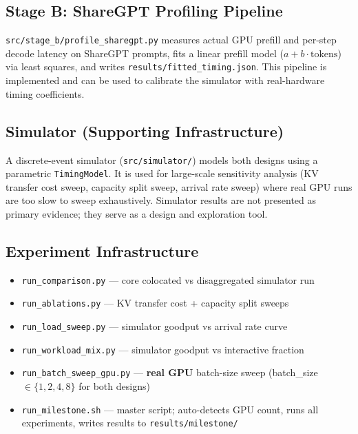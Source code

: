 \documentclass[11pt,letterpaper]{article}
\begin{document}
\subsection{Stage B: ShareGPT Profiling Pipeline}

\texttt{src/stage\_b/profile\_sharegpt.py} measures actual GPU prefill and per-step
decode latency on ShareGPT prompts, fits a linear prefill model
($a + b \cdot \text{tokens}$) via least squares, and writes
\texttt{results/fitted\_timing.json}. This pipeline is implemented and can be used
to calibrate the simulator with real-hardware timing coefficients.

\subsection{Simulator (Supporting Infrastructure)}

A discrete-event simulator (\texttt{src/simulator/}) models both designs using a
parametric \texttt{TimingModel}. It is used for large-scale sensitivity analysis
(KV transfer cost sweep, capacity split sweep, arrival rate sweep) where real GPU
runs are too slow to sweep exhaustively. Simulator results are not presented as
primary evidence; they serve as a design and exploration tool.

\subsection{Experiment Infrastructure}

\begin{itemize}[noitemsep,topsep=2pt]
  \item \texttt{run\_comparison.py} --- core colocated vs disaggregated simulator run
  \item \texttt{run\_ablations.py} --- KV transfer cost + capacity split sweeps
  \item \texttt{run\_load\_sweep.py} --- simulator goodput vs arrival rate curve
  \item \texttt{run\_workload\_mix.py} --- simulator goodput vs interactive fraction
  \item \texttt{run\_batch\_sweep\_gpu.py} --- \textbf{real GPU} batch-size sweep
        (batch\_size $\in \{1,2,4,8\}$ for both designs)
  \item \texttt{run\_milestone.sh} --- master script; auto-detects GPU count,
        runs all experiments, writes results to \texttt{results/milestone/}
\end{itemize}
\end{document}
